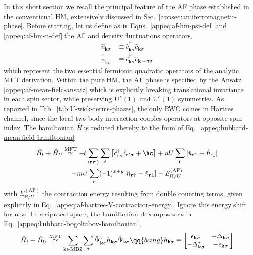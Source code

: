In this short section we recall the principal feature of the AF phase established in the conventional HM, extensively discussed in Sec.~\ref{appsec:antiferromagnetic-phase}. Before starting, let us define as in Eqns.~\eqref{appeq:af-hm-psi-def} and \eqref{appeq:af-hm-n-def} the AF and density fluctuations operators,
\begin{align}
	\hat n_{\mathbf{k}\sigma} &\equiv \hat c_{\mathbf{k}\sigma}^\dagger \hat c_{\mathbf{k}\sigma} \label{eq:af-hm-n-def} \\
	\hat \psi_{\mathbf{k}\sigma} &\equiv \hat c_{\mathbf{k}\sigma}^\dagger \hat c_{\mathbf{k}+\bm{\pi}\sigma} \label{eq:af-hm-psi-def}
\end{align}
which represent the two essential fermionic quadratic operators of the analytic MFT derivation. Within the pure HM, the AF phase is specified by the Ansatz \eqref{appeq:af-mean-field-ansatz} which is explicitly breaking translational invariance in each spin sector, while preserving $\mathrm{U}^z(1)$ and $\mathrm{U}^c(1)$ symmetries. As reported in Tab.~\ref{tab:U-wick-terms-phases}, the only RWC comes in Hartree channel, since the local two-body interaction couples operators at opposite spin index. The hamiltonian $\hat H$ is reduced thereby to the form of Eq.~\eqref{appeq:hubbard-mean-field-hamiltonian}
\begin{multline*}
	\hat H_t + \hat H_U \stackrel{\mathrm{MFT}}{\simeq} -t \sum_{\langle \mathbf{r}\mathbf{r}' \rangle} \sum_\sigma 
	\left[
		\hat c_{\mathbf{r}\sigma}^\dagger \hat c_{\mathbf{r}'\sigma} + \hc
	\right]
	+ nU \sum_\mathbf{r} \left[
		\hat n_{\mathbf{r}\uparrow} + \hat n_{\mathbf{r}\downarrow}
	\right] \\
	- mU \sum_\mathbf{r} (-1)^{x+y} \left[
		\hat n_{\mathbf{r}\uparrow} - \hat n_{\mathbf{r}\downarrow}
	\right] - E_{\mathrm{H}/U}^{(\mathrm{AF})}
\end{multline*}
with $E_{\mathrm{H}/U}^{(\mathrm{AF})}$ the contraction energy resulting from double counting terms, given explicitly in Eq.~\eqref{appeq:af-hartree-V-contraction-energy}. Ignore this energy shift for now. In reciprocal space, the hamiltonian decomposes as in Eq.~\eqref{appeq:hubbard-bogoliubov-hamiltonian},
\[
	\hat H_t + \hat H_U \stackrel{\mathrm{MFT}}{\simeq} \sum_{\mathbf{k} \in \mathrm{MBZ}} \sum_\sigma \hat \Psi_{\mathbf{k}\sigma}^\dagger h_{\mathbf{k}\sigma} \hat \Psi_{\mathbf{k}\sigma}
	\qq{being}
	h_{\mathbf{k}\sigma} \equiv \begin{bmatrix}
		\epsilon_{\mathbf{k}\sigma} & -\Delta_{\mathbf{k}\sigma} \\
		-\Delta_{\mathbf{k}\sigma}^* & - \epsilon_{\mathbf{k}\sigma}
	\end{bmatrix}
\]
